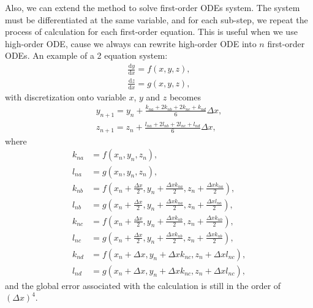 \begin{anexosenv}
    Also, we can extend the method to solve first-order ODEs system. The system must be differentiated at the same variable, and for each sub-step, we repeat the process of calculation for each first-order equation. This is useful when we use high-order ODE, cause we always can rewrite high-order ODE into $n$ first-order ODEs. An example of a 2 equation system:
    \begin{subequations}
        \begin{align}
            \frac{\mathrm{d}y}{\mathrm{d}x} = f(x,y,z),\\
            \frac{\mathrm{d}z}{\mathrm{d}x} = g(x,y,z),
        \end{align}
    \end{subequations}
with discretization onto variable $x$, $y$ and $z$ becomes
    \begin{subequations}
        \begin{align}
            y_{n+1} = y_n + \frac{k_{na}+2k_{nb}+2k_{nc}+k_{nd}}{6}\Delta x,\\
            z_{n+1} = z_n + \frac{l_{na}+2l_{nb}+2l_{nc}+l_{nd}}{6}\Delta x,
        \end{align}
    \end{subequations}
where
    \begin{subequations}
        \begin{align}
            k_{na} &= f(x_n, y_n, z_n),\\
            l_{na} &= g(x_n, y_n, z_n),\\
            k_{nb} &= f\left(x_n +\frac{\Delta x}{2}, y_n+\frac{\Delta x k_{na}}{2}, z_n+\frac{\Delta x k_{na}}{2}\right),\\
            l_{nb} &= g\left(x_n +\frac{\Delta x}{2}, y_n+\frac{\Delta x k_{na}}{2}, z_n+\frac{\Delta x l_{na}}{2}\right),\\
            k_{nc} &= f\left(x_n +\frac{\Delta x}{2}, y_n+\frac{\Delta x k_{nb}}{2}, z_n+\frac{\Delta x k_{nb}}{2}\right),\\
            l_{nc} &= g\left(x_n +\frac{\Delta x}{2}, y_n+\frac{\Delta x k_{nb}}{2}, z_n+\frac{\Delta x k_{nb}}{2}\right),\\
            k_{nd} &= f(x_n +\Delta x, y_n +\Delta x k_{nc}, z_n +\Delta x l_{nc}),\\
            l_{nd} &= g(x_n +\Delta x, y_n +\Delta x k_{nc}, z_n +\Delta x l_{nc}),
        \end{align}
    \end{subequations}
and the global error associated with the calculation is still in the order of $(\Delta x)^4$.

\end{anexosenv}
